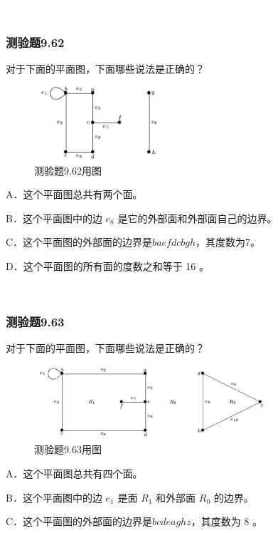 \documentclass[UTF8, heading=true]{ctexart}
\begin{document}
\textcolor{white}{答案：CD}

\subsubsection{测验题9.62}

对于下面的平面图，下面哪些说法是正确的？

\begin{figure}[H]
  \centering
  \includegraphics[width=0.45\textwidth]{9.62.jpg} %
  \caption{测验题9.62用图}
\end{figure}

A．这个平面图总共有两个面。

B．这个平面图中的边 $e_8$ 是它的外部面和外部面自己的边界。

C．这个平面图的外部面的边界是$baefdcbgh$，其度数为7。

D．这个平面图的所有面的度数之和等于 16 。

\textcolor{white}{答案：BD}

\subsubsection{测验题9.63}

对于下面的平面图，下面哪些说法是正确的？

\begin{figure}[H]
  \centering
  \includegraphics[width=0.79\textwidth]{9.63.jpg} %
  \caption{测验题9.63用图}
\end{figure}

A．这个平面图总共有四个面。

B．这个平面图中的边 $e_1$ 是面 $R_1$ 和外部面 $R_0$ 的边界。

C．这个平面图的外部面的边界是$bcdeaghz$，其度数为 8 。
\end{document}
